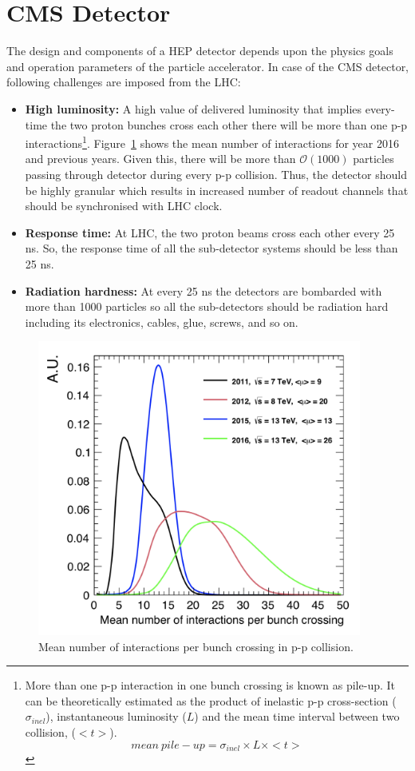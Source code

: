 \section{CMS Detector} %
\label{sec:cms_experiment}
The design and components of a HEP detector depends upon the physics goals and operation parameters of the particle accelerator. In case of the CMS detector, following challenges are imposed from the LHC:
\begin{itemize}
	\item \textbf{High luminosity:} A high value of  delivered luminosity that implies every-time the two proton bunches cross each other there will be more than one p-p interactions\footnote{More than one p-p interaction in one bunch crossing is known as pile-up. It can be theoretically estimated as the product of inelastic p-p cross-section ($\sigma_{inel}$), instantaneous luminosity ($L$) and the mean time interval between two collision, ($< t >$). \begin{equation}
		mean~pile-up = \sigma_{inel} \times L \times <t>
	\end{equation}}. Figure~\ref{fig:pile-up} shows the mean number of interactions for year 2016 and previous years. Given this, there will be more than $\mathcal{O}(1000)$ particles passing through detector during every p-p collision. Thus, the detector should be highly granular which results in increased number of readout channels that should be synchronised with LHC clock.
	\item \textbf{Response time:} At LHC, the two proton beams cross each other every 25 ns. So, the response time of all the sub-detector systems should be less than 25 ns.
	\item \textbf{Radiation hardness:} At every 25 ns the detectors are bombarded with more than 1000 particles so all the sub-detectors should be radiation hard including its electronics, cables, glue, screws, and so on.
\end{itemize}
\begin{figure}[!htbp]
	\centering
	\includegraphics[width=0.95\textwidth]{figures/LHC/pileup.jpg}
	\caption{Mean number of interactions per bunch crossing in p-p collision.}
	\label{fig:pile-up}
\end{figure}
